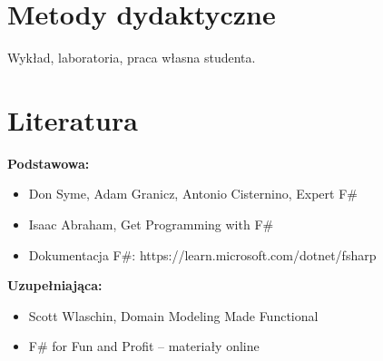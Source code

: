 \documentclass[12pt, a4paper]{article}
\begin{document}
\section{Metody dydaktyczne}

Wykład, laboratoria, praca własna studenta.

\section{Literatura}

\textbf{Podstawowa:}
\begin{itemize}
  \item Don Syme, Adam Granicz, Antonio Cisternino, Expert F\#
  \item Isaac Abraham, Get Programming with F\#
  \item Dokumentacja F\#: https://learn.microsoft.com/dotnet/fsharp
\end{itemize}

\textbf{Uzupełniająca:}
\begin{itemize}
  \item Scott Wlaschin, Domain Modeling Made Functional
  \item F\# for Fun and Profit – materiały online
\end{itemize}
\end{document}
